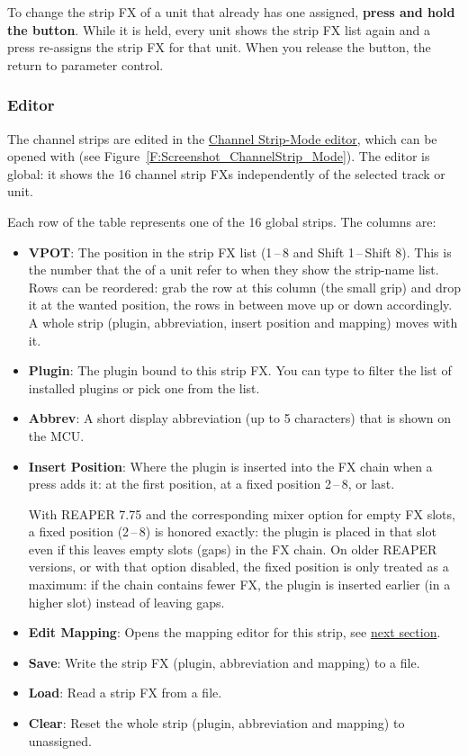 To change the strip FX of a unit that already has one assigned,
\textbf{press and hold the \track button}. While it is held, every
unit shows the strip FX list again and a \vpot press re-assigns the
strip FX for that unit. When you release the \track button, the \vpots
return to parameter control.

\subsubsection{Editor}\label{channelstripeditor}
The channel strips are edited in the \hyperref[F:Screenshot_ChannelStrip_Mode]{Channel
Strip-Mode editor}, which can be opened with \alt \track (see
Figure~\ref{F:Screenshot_ChannelStrip_Mode}). The editor is global: it shows
the 16 channel strip FXs independently of the selected track or unit.


Each row of the table represents one of the 16 global strips. The columns
are:

\begin{itemize}
\item \textbf{VPOT}: The position in the strip FX list (1\,--\,8
  and Shift 1\,--\,Shift 8). This is the number that the \vpots of a unit
  refer to when they show the strip-name list. Rows can be reordered: grab
  the row at this column (the small grip) and drop it at the wanted
  position, the rows in between move up or down accordingly. A whole strip
  (plugin, abbreviation, insert position and \vpot mapping) moves with it.
\item \textbf{Plugin}: The plugin bound to this strip FX. You can type to filter
  the list of installed plugins or pick one from the list.
\item \textbf{Abbrev}: A short display abbreviation (up to 5 characters)
  that is shown on the MCU. 
\item \textbf{Insert Position}: Where the plugin is inserted into the FX
  chain when a \vpot press adds it: at the first position, at a fixed
  position 2\,--\,8, or last.
  
  \par With REAPER 7.75 and the corresponding mixer option for empty FX
  slots, a fixed position (2\,--\,8) is honored exactly: the plugin is placed
  in that slot even if this leaves empty slots (gaps) in the FX chain. On
  older REAPER versions, or with that option disabled, the fixed position is
  only treated as a maximum: if the chain contains fewer FX, the plugin is
  inserted earlier (in a higher slot) instead of leaving gaps. 
\item \textbf{Edit Mapping}: Opens the mapping editor for this strip, see
  \hyperref[stripmapping]{next section}.
\item \textbf{Save}: Write the strip FX (plugin, abbreviation and \vpot
  mapping) to a file.
\item \textbf{Load}: Read a strip FX from a file.
\item \textbf{Clear}: Reset the whole strip (plugin, abbreviation and \vpot
  mapping) to unassigned.
\end{itemize}

